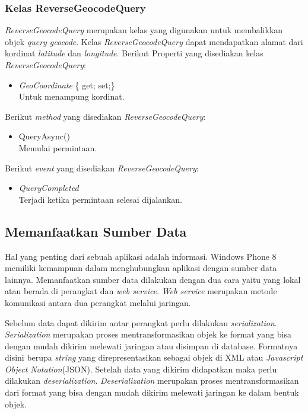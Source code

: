 \subsubsection{Kelas ReverseGeocodeQuery}
\label{subsubsec:Kelas ReverseGeocodeQuery}
\hspace{0.5cm} \textit{ReverseGeocodeQuery} merupakan kelas yang digunakan untuk membalikkan objek \textit{query geocode}. Kelas \textit{ReverseGeocodeQuery} dapat mendapatkan alamat dari kordinat \textit{latitude} dan \textit{longitude}.
Berikut Properti yang disediakan kelas \textit{ReverseGeocodeQuery}:
\begin{itemize}
	\item \textit{GeoCoordinate} \{ get; set;\} \\
	Untuk menampung kordinat.
\end{itemize}

Berikut \textit{method} yang disediakan \textit{ReverseGeocodeQuery}:
\begin{itemize}
	\item QueryAsync() \\
		Memulai permintaan.
\end{itemize}

Berikut \textit{event} yang disediakan \textit{ReverseGeocodeQuery}:
\begin{itemize}
	\item \textit{QueryCompleted} \\
		Terjadi ketika permintaan selesai dijalankan.
\end{itemize}

\subsection{Memanfaatkan Sumber Data}
\label{subsec:Memanfaatkan Sumber Data}
\hspace{0.5cm} Hal yang penting dari sebuah aplikasi adalah informasi. Windows Phone 8 memiliki kemampuan dalam menghubungkan aplikasi dengan sumber data lainnya. Memanfaatkan sumber data dilakukan dengan dua cara yaitu yang lokal atau berada di perangkat dan \textit{web service}. \textit{Web service} merupakan metode komunikasi antara dua perangkat melalui jaringan. 

Sebelum data dapat dikirim antar perangkat perlu dilakukan \textit{serialization}. \textit{Serialization} merupakan proses mentransformasikan objek ke format yang bisa dengan mudah dikirim melewati jaringan atau disimpan di database\cite{Manning}. Formatnya disini berupa \textit{string} yang direpresentasikan sebagai objek di XML atau \textit{Javascript Object Notation}(JSON). Setelah data yang dikirim didapatkan maka perlu dilakukan \textit{deserialization}. \textit{Deserialization} merupakan proses mentransformasikan dari format yang bisa dengan mudah dikirim melewati jaringan ke dalam bentuk objek. 

